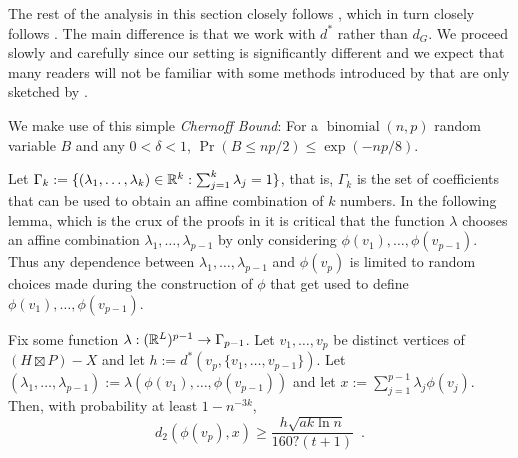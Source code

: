 \documentclass{patmorin}
\renewcommand{\ge}{\geqslant}
\renewcommand{\le}{\leqslant}
\newcommand{\defin}[1]{\emph{\textcolor{brightmaroon}{#1}}}
\begin{document}
The rest of the analysis in this section closely follows \citet{rao:small}, which in turn closely follows \citet{feige:approximating}.  The main difference is that we work with $d^*$ rather than $d_G$.  We proceed slowly and carefully since our setting is significantly different and we expect that many readers will not be familiar with some methods introduced by \citet{feige:approximating} that are only sketched by \citet{rao:small}.

We make use of this simple \defin{Chernoff Bound}:  For a $\operatorname{binomial}(n,p)$ random variable $B$ and any $0<\delta<1$, $\Pr(B \le np/2) \le \exp(-np/8)$.

Let $\Gamma_k:=\{(\lambda_1,\ldots,\lambda_k)\in \mathbb{R}^k:\sum_{j=1}^k\lambda_j=1\}$, that is, $\Gamma_k$ is the set of coefficients that can be used to obtain an affine combination of $k$ numbers.  In the following lemma, which is the crux of the proofs in \cite{rao:small,feige:approximating} it is critical that the function $\lambda$ chooses an affine combination $\lambda_1,\ldots,\lambda_{p-1}$ by only considering $\phi(v_1),\ldots,\phi(v_{p-1})$.  Thus any dependence between $\lambda_1,\ldots,\lambda_{p-1}$ and $\phi(v_p)$ is limited to random choices made during the construction of $\phi$ that get used to define $\phi(v_1),\ldots,\phi(v_{p-1})$.


\begin{lem}\label{crux}
  Fix some function $\lambda:(\mathbb{R}^{L})^{p-1}\to \Gamma_{p-1}$.
  Let $v_1,\ldots,v_p$ be distinct vertices of $(H\boxtimes P)-X$ and let $h:=d^*(v_p,\{v_1,\ldots,v_{p-1}\})$.  Let $(\lambda_1,\ldots,\lambda_{p-1}):=\lambda(\phi(v_1),\ldots,\phi(v_{p-1}))$ and let $x:=\sum_{j=1}^{p-1}\lambda_j\phi(v_j)$.
  Then, with probability at least $1-n^{-3k}$,
  \[
    d_2(\phi(v_p),x)\ge \frac{h\sqrt{ak\ln n}}{160?(t+1)} \enspace
  . \]
\end{lem}
\end{document}
